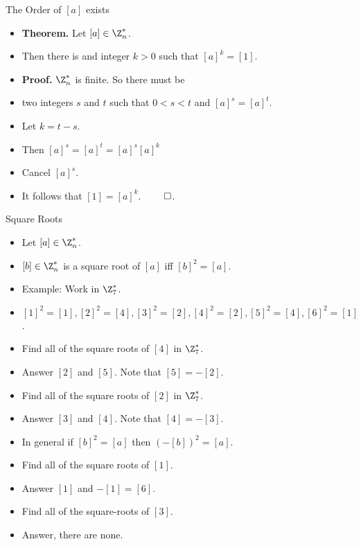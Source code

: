 \documentclass{beamer}
\begin{document}
\begin{frame}{The Order of $[a]$ exists}

\begin{itemize}
  \item \textbf{Theorem.} Let $[a]\in\Z^*_n$.
  \item Then there is and integer $k>0$ such that $[a]^k=[1]$.
  \item \textbf{Proof.} $\Z^*_n$ is finite. So there must be
  \item two integers $s$ and $t$ such that $0<s<t$ and $[a]^s=[a]^t$.
  \item Let $k=t-s$.
  \item Then $[a]^s = [a]^t = [a]^s [a]^k$
  \item Cancel $[a]^s$.
  \item It follows that $[1] = [a]^k$. $\qed$.
\end{itemize}

\end{frame}

\begin{frame}{Square Roots}

\begin{itemize}
  \item Let $[a]\in\Z_n^*$.
  \item $[b]\in\Z^*_n$ is a square root of $[a]$ iff $[b]^2=[a]$.
  \item Example: Work in $\Z_7^*$.
  \item $[1]^2=[1], [2]^2=[4], [3]^2 = [2], [4]^2=[2], [5]^2=[4], [6]^2 = [1]$.
  \item Find all of the square roots of $[4]$ in $\Z_7^*$.
  \item Answer $[2]$ and $[5]$. Note that $[5] = -[2]$.
  \item Find all of the square roots of $[2]$ in $\Z_7^*$.
  \item Answer $[3]$ and $[4]$. Note that $[4] = -[3]$.
  \item In general if $[b]^2=[a]$ then $(-[b])^2=[a]$.
  \item Find all of the square roots of $[1]$.
  \item Answer $[1]$ and $-[1]=[6]$.
  \item Find all of the square-roots of $[3]$.
  \item Answer, there are none.
\end{itemize}

\end{frame}
\end{document}
